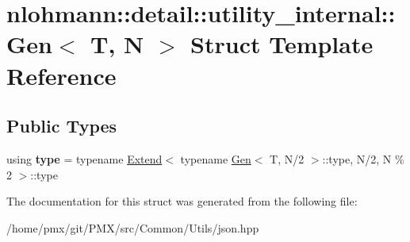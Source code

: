 \hypertarget{structnlohmann_1_1detail_1_1utility__internal_1_1Gen}{}\section{nlohmann\+:\+:detail\+:\+:utility\+\_\+internal\+:\+:Gen$<$ T, N $>$ Struct Template Reference}
\label{structnlohmann_1_1detail_1_1utility__internal_1_1Gen}
\subsection*{Public Types}
\begin{DoxyCompactItemize}
\item 
\mbox{\label{structnlohmann_1_1detail_1_1utility__internal_1_1Gen_a1d6f2c7fb3fa065bf8cf6e6e3544dcef}} 
using {\bfseries type} = typename \hyperlink{structnlohmann_1_1detail_1_1utility__internal_1_1Extend}{Extend}$<$ typename \hyperlink{structnlohmann_1_1detail_1_1utility__internal_1_1Gen}{Gen}$<$ T, N/2 $>$\+::type, N/2, N \% 2 $>$\+::type
\end{DoxyCompactItemize}


The documentation for this struct was generated from the following file\+:\begin{DoxyCompactItemize}
\item 
/home/pmx/git/\+P\+M\+X/src/\+Common/\+Utils/json.\+hpp\end{DoxyCompactItemize}
